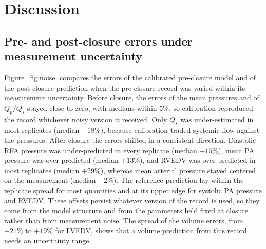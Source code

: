 \FloatBarrier
\section{Discussion}
\label{sec:discussion}

\subsection{Pre- and post-closure errors under measurement uncertainty}
\label{sec:disc_noise}
Figure~\ref{fig:noise} compares the errors of the calibrated pre-closure model and of the post-closure prediction when the pre-closure record was varied within its measurement uncertainty. Before closure, the errors of the mean pressures and of $Q_p/Q_s$ stayed close to zero, with medians within 5\%, so calibration reproduced the record whichever noisy version it received. Only $Q_s$ was under-estimated in most replicates (median $-18\%$), because calibration traded systemic flow against the pressures. After closure the errors shifted in a consistent direction. Diastolic RFA pressure was under-predicted in every replicate (median $-15\%$), mean PA pressure was over-predicted (median $+13\%$), and RVEDV was over-predicted in most replicates (median $+29\%$), whereas mean arterial pressure stayed centered on the measurement (median $+2\%$). The reference prediction lay within the replicate spread for most quantities and at its upper edge for systolic PA pressure and RVEDV. These offsets persist whatever version of the record is used, so they come from the model structure and from the parameters held fixed at closure rather than from measurement noise. The spread of the volume errors, from $-21\%$ to $+19\%$ for LVEDV, shows that a volume prediction from this record needs an uncertainty range.

